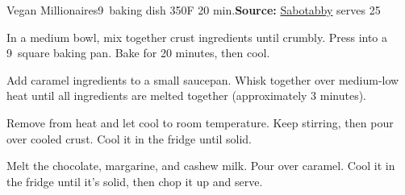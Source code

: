 \begin{recipe}{Vegan Millionaires}{9\inch{}\inch\ baking dish \hfill 350\0F \hfill 20 min.}{\textbf{Source:} \href{https://sabotabby.dreamwidth.org/2089568.html}{Sabotabby} \hfill serves 25}

  In a medium bowl, mix together crust ingredients until crumbly. Press into a 9\inch\ square baking pan. Bake for 20 minutes, then cool.

Add caramel ingredients to a small saucepan. Whisk together over medium-low heat until all ingredients are melted together (approximately 3 minutes).

\newstep Remove from heat and let cool to room temperature. Keep stirring, then pour over cooled crust. Cool it in the fridge until solid.

Melt the chocolate, margarine, and cashew milk. Pour over caramel. Cool it in the fridge until it’s solid, then chop it up and serve.
\end{recipe}